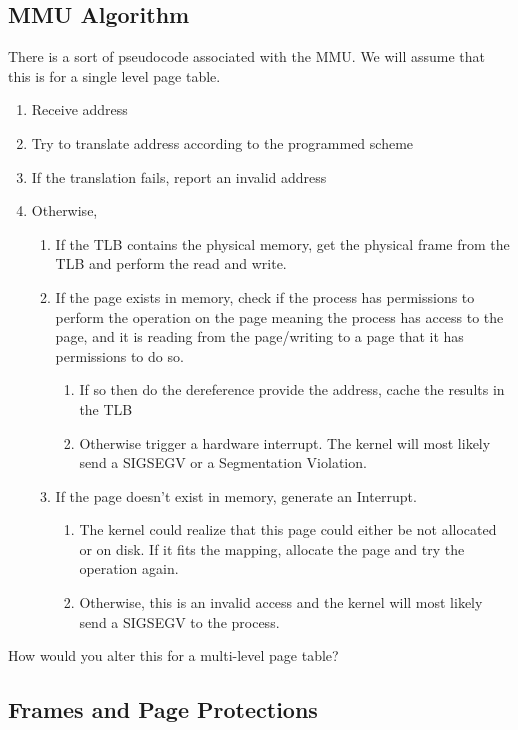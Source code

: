 \subsection{MMU Algorithm}

There is a sort of pseudocode associated with the MMU.
We will assume that this is for a single level page table.

\begin{enumerate}
\item Receive address
\item Try to translate address according to the programmed scheme
\item If the translation fails, report an invalid address
\item Otherwise,
	\begin{enumerate}
  \item If the TLB contains the physical memory, get the physical frame from the TLB and perform the read and write.
	\item If the page exists in memory, check if the process has permissions
		to perform the operation on the page meaning the process has access
		to the page, and it is reading from the page/writing to a page
		that it has permissions to do so.
		\begin{enumerate}
		\item If so then do the dereference provide the address, cache the results in the TLB
		\item Otherwise trigger a hardware interrupt. The kernel
			will most likely send a SIGSEGV or a Segmentation Violation.
		\end{enumerate}
	\item If the page doesn't exist in memory, generate an Interrupt.
		\begin{enumerate}
		\item The kernel could realize that this page could either be not
			allocated or on disk.
      If it fits the mapping, allocate the page and try the operation again.
		\item Otherwise, this is an invalid access and the kernel will most likely send a SIGSEGV to the process.
		\end{enumerate}
	\end{enumerate}
\end{enumerate}

How would you alter this for a multi-level page table?

\subsection{Frames and Page Protections}


